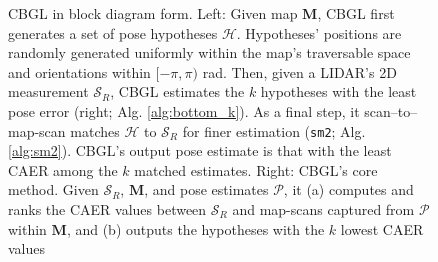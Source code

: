 \begin{figure}\vspace{-0.4cm}
  \subfloat{\label{fig:cbgl}     }
  \subfloat{\label{fig:bottom_k} }
  \caption{\small CBGL in block diagram form. Left: Given map $\bm{M}$, CBGL
           first generates a set of pose hypotheses $\mathcal{H}$. Hypotheses'
           positions are randomly generated uniformly within the map's
           traversable space and orientations within $[-\pi,\pi)$ rad. Then,
           given a LIDAR's 2D measurement $\mathcal{S}_R$, CBGL
           estimates the $k$ hypotheses with the least pose error (right; Alg.
           \ref{alg:bottom_k}).
           As a final step, it scan--to--map-scan
           matches $\mathcal{H}$ to $\mathcal{S}_R$ for finer estimation
           (\texttt{sm2}; Alg.
           \ref{alg:sm2}).
           CBGL's output pose estimate is that with
           the least CAER among the $k$ matched estimates.  Right: CBGL's core
           method. Given $\mathcal{S}_R$, $\bm{M}$, and pose estimates
           $\mathcal{P}$, it (a) computes and ranks the CAER values between
           $\mathcal{S}_R$ and map-scans captured from $\mathcal{P}$ within
           $\bm{M}$, and (b) outputs the hypotheses with the $k$ lowest CAER
           values}
\vspace{-0.5cm}
  \label{fig:block_system}
\end{figure}


